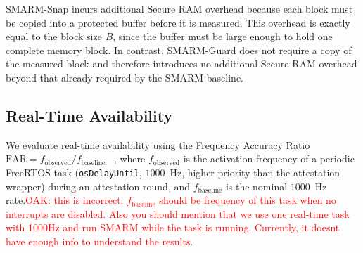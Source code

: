 \documentclass[conference]{IEEEtran}
\newcommand{\tdis}{$t_{\mathrm{disabled}}$\xspace}
\newcommand{\smarmcopy}{SMARM-Snap\xspace}
\newcommand{\smarmlock}{SMARM-Guard\xspace}
\newcommand\oak[1]{\textcolor{red}{OAK: #1}}
\begin{document}
\smarmcopy incurs additional Secure RAM overhead because each block must be copied into a protected buffer before it is measured. This overhead is exactly equal to the block size $B$, since the buffer must be large enough to hold one complete memory block.
In contrast, \smarmlock does not require a copy of the measured block and therefore introduces no additional Secure RAM overhead beyond that already required by the SMARM baseline. 


\subsection{Real-Time Availability}



We evaluate real-time availability using the Frequency Accuracy
Ratio $\mathrm{FAR}=f_{\mathrm{observed}}/f_{\mathrm{baseline}}$
~\cite{smarmplus2026}, where $f_{\mathrm{observed}}$ is the activation
frequency of a periodic FreeRTOS task (\texttt{osDelayUntil},
$1000$~Hz, higher priority than the attestation wrapper) during an
attestation round, and $f_{\mathrm{baseline}}$ is the nominal
$1000$~Hz rate.\oak{this is incorrect. $f_{\mathrm{baseline}}$ should be frequency of this task when no interrupts are disabled. Also you should mention that we use one real-time task with 1000Hz and run SMARM while the task is running. Currently, it doesnt have enough info to understand the results.}
\end{document}
